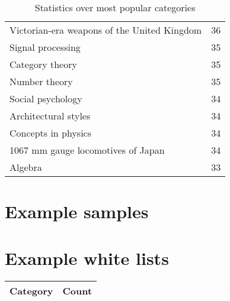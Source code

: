 \begin{appendices}
\begin{table}[h!]
\begin{tabular} {|| p{20em} | p{5em} ||}
Victorian-era weapons of the United Kingdom & 36 \\
Signal processing & 35 \\
Category theory & 35 \\
Number theory & 35 \\
Social psychology & 34 \\
Architectural styles & 34 \\
Concepts in physics & 34 \\
1067 mm gauge locomotives of Japan & 34 \\
Algebra & 33 \\
 \hline
\end{tabular}
\caption{Statistics over most popular categories}
\label{table:A.1}
\end{table}

\chapter{Example samples} \label{app_example}




\chapter{Example white lists} \label{app_whitelist}

\centering
\begin{longtable} {|| p{20em} | p{5em} ||} 
 \hline
 Category & Count \\ [0.5ex] 
 \hline
 

\end{longtable}
\end{appendices}
